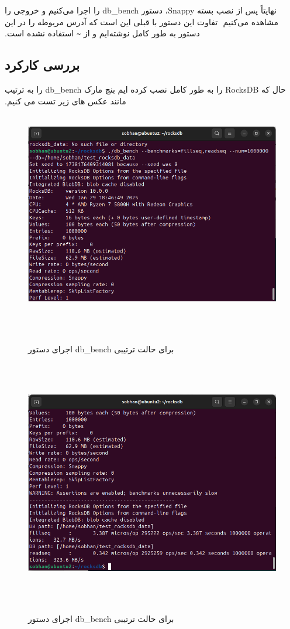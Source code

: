 ‫
‫نهایتاً پس از نصب بسته Snappy، دستور db\_bench را اجرا می‌کنیم و خروجی را مشاهده می‌کنیم
‫
‫تفاوت این دستور با قبلی این است که آدرس مربوطه را در این دستور به طور کامل نوشته‌ایم و از \texttt{\textasciitilde} استفاده نشده است.
‫
‫‫\subsection*{بررسی کارکرد}
‫حال که RocksDB را به طور کامل نصب کرده ایم بنچ مارک db\_bench را به ترتیب مانند عکس های زیر تست می کنیم.
‫
‫\begin{figure}[H]
‫    \centering
‫    \includegraphics[width=\textwidth]{figs/6.png}
‫    \caption{اجرای دستور db\_bench برای حالت ترتیبی}
‫\end{figure}
‫
‫\begin{figure}[H]
‫    \centering
‫    \includegraphics[width=\textwidth]{figs/7.png}
‫    \caption{اجرای دستور db\_bench برای حالت ترتیبی}
‫\end{figure}
